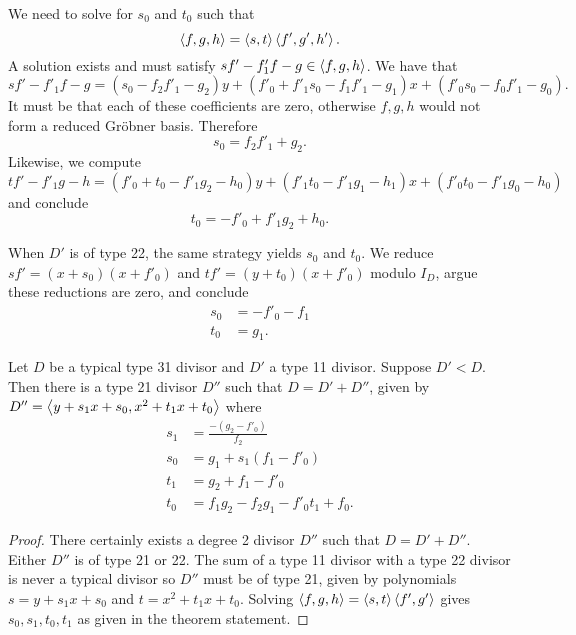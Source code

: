 We need to solve for $s_0$ and $t_0$ such that
\[ \left\langle f, g, h \right\rangle = \left\langle s, t \right\rangle\left\langle f', g', h' \right\rangle. \]
A solution exists and must satisfy $sf' - f'_1f - g \in \left\langle f,g,h \right\rangle$.
We have that
  \[ sf' - f'_1f - g = (s_0 - f_2f'_1 - g_2)y + (f'_0 + f'_1s_0 - f_1f'_1 - g_1)x + (f'_0s_0 - f_0f'_1 - g_0). \]
It must be that each of these coefficients are zero, otherwise $f, g, h$ would not form a reduced Gr\"obner basis.
Therefore
  \[ s_0 = f_2f'_1 + g_2. \]
Likewise, we compute
  \[ tf' - f'_1g - h = (f'_0 + t_0 - f'_1g_2 - h_0)y + (f'_1t_0 - f'_1g_1 - h_1)x + (f'_0t_0 - f'_1g_0 - h_0) \]
and conclude
  \[ t_0 = - f'_0 + f'_1g_2 + h_0. \]

When $D'$ is of type 22, the same strategy yields $s_0$ and $t_0$.
We reduce $sf' = (x + s_0)(x + f'_0)$ and $tf' = (y + t_0)(x + f'_0)$ modulo $I_D$,
argue these reductions are zero, and conclude
\begin{align*}
  s_0 &= - f'_0 - f_1 \\
  t_0 &= g_1.
\end{align*}

\begin{proposition}
  Let $D$ be a typical type 31 divisor and $D'$ a type 11 divisor.
  Suppose $D' < D$.
  Then there is a type 21 divisor $D''$ such that $D = D' + D''$,
  given by $D'' = \left\langle y + s_1x + s_0, x^2 + t_1x + t_0 \right\rangle$ where
    \begin{align*}
      s_1 &= \frac{-(g_2 - f'_0)} {f_2} \\
      s_0 &= g_1 + s_1(f_1 - f'_0) \\
      t_1 &= g_2 + f_1 - f'_0 \\
      t_0 &= f_1g_2 - f_2g_1 - f'_0t_1 + f_0.
    \end{align*}
\end{proposition}
\begin{proof}
  There certainly exists a degree 2 divisor $D''$ such that $D = D' + D''$.
  Either $D''$ is of type 21 or 22.
  The sum of a type 11 divisor with a type 22 divisor is never a typical divisor 
  so $D''$ must be of type 21, given by polynomials $s = y + s_1x + s_0$ and $t = x^2 + t_1x + t_0$.
  Solving $\left\langle f, g, h \right\rangle = \left\langle s,t \right\rangle\left\langle f',g' \right\rangle$ gives $s_0, s_1, t_0, t_1$ as given in the theorem statement.
\end{proof}

